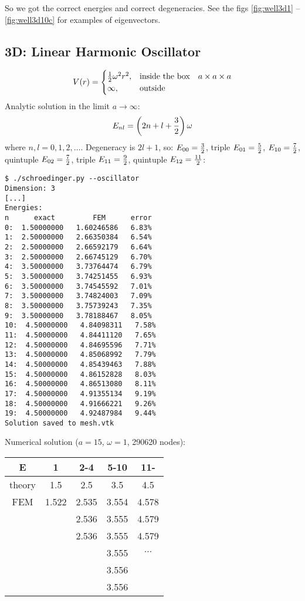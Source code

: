 So we got the correct energies and correct degeneracies. See the figs
\ref{fig:well3d1} -- \ref{fig:well3d10c} for examples of eigenvectors.




\subsection{3D: Linear Harmonic Oscillator}

$$V(r)=\begin{cases}{\textstyle{1\over2}}\omega^2r^2,&\text{inside the box}\quad a\times a\times a \\
\infty, & \text{outside}\end{cases}$$
Analytic solution in the limit $a\to\infty$:
$$E_{nl}=\left(2n+l+{3\over2}\right)\omega$$
where $n, l = 0, 1, 2, \dots$.
Degeneracy is $2l+1$, so:
$E_{00} = {3\over2}$,
triple $E_{01} = {5\over2}$,
$E_{10} = {7\over2}$,
quintuple $E_{02} = {7\over2}$,
triple $E_{11} = {9\over2}$,
quintuple $E_{12} = {11\over2}$:

\begin{lstlisting}
$ ./schroedinger.py --oscillator
Dimension: 3
[...]
Energies:
n      exact         FEM      error
0:  1.50000000   1.60246586   6.83%
1:  2.50000000   2.66350384   6.54%
2:  2.50000000   2.66592179   6.64%
3:  2.50000000   2.66745129   6.70%
4:  3.50000000   3.73764474   6.79%
5:  3.50000000   3.74251455   6.93%
6:  3.50000000   3.74545592   7.01%
7:  3.50000000   3.74824003   7.09%
8:  3.50000000   3.75739243   7.35%
9:  3.50000000   3.78188467   8.05%
10:  4.50000000   4.84098311   7.58%
11:  4.50000000   4.84411120   7.65%
12:  4.50000000   4.84695596   7.71%
13:  4.50000000   4.85068992   7.79%
14:  4.50000000   4.85439463   7.88%
15:  4.50000000   4.86152828   8.03%
16:  4.50000000   4.86513080   8.11%
17:  4.50000000   4.91355134   9.19%
18:  4.50000000   4.91666221   9.26%
19:  4.50000000   4.92487984   9.44%
Solution saved to mesh.vtk
\end{lstlisting}

Numerical solution ($a=15$, $\omega=1$, 290620 nodes):

\begin{tabular}{ c | c c c c }
E      & 1 & 2-4 & 5-10 & 11- \\
\hline
theory & 1.5 & 2.5 & 3.5 & 4.5 \\
FEM    & 1.522 & 2.535 & 3.554 & 4.578 \\
       &        & 2.536 & 3.555 & 4.579 \\
       &        & 2.536 & 3.555 & 4.579 \\
       &        &       & 3.555 &  $\cdots$ \\
       &        &       & 3.556 &   \\
       &        &       & 3.556 &   \\
\end{tabular}

